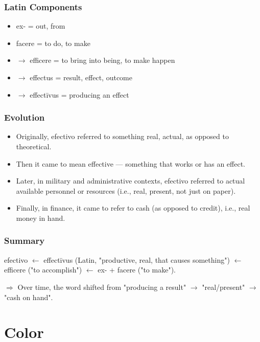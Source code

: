 \documentclass[10pt]{book}
\begin{document}
	\subsection{Latin Components}
	
	\begin{itemize}
		\item ex- = out, from
		\item facere = to do, to make
		\item $\rightarrow$ efficere = to bring into being, to make happen
		\item $\rightarrow$ effectus = result, effect, outcome
		\item $\rightarrow$ effectīvus = producing an effect
	\end{itemize}
	
	\subsection{Evolution}
	
	\begin{itemize}
		\item Originally, efectivo referred to something real, actual, as opposed to theoretical.
		\item Then it came to mean effective — something that works or has an effect.
		\item Later, in military and administrative contexts, efectivo referred to actual available personnel or resources (i.e., real, present, not just on paper).
		\item Finally, in finance, it came to refer to cash (as opposed to credit), i.e., real money in hand.
	\end{itemize}
	
	\subsection{Summary}
	efectivo $\leftarrow$ effectīvus (Latin, "productive, real, that causes something") $\leftarrow$ efficere ("to accomplish") $\leftarrow$ ex- + facere ("to make").
	
	$\Rightarrow$ Over time, the word shifted from "producing a result" $\rightarrow$ "real/present" $\rightarrow$ "cash on hand".

\chapter{Color}
	
\end{document}
